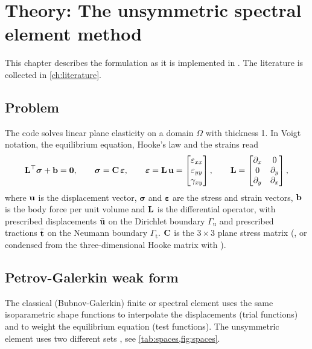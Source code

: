\chapter{Theory: The unsymmetric spectral element method}
\label{ch:theory}

This chapter describes the formulation as it is implemented in
. The literature is collected in \cref{ch:literature}.

\section{Problem}

The code solves linear plane elasticity on a domain $\Omega$ with thickness 1. In
Voigt notation, the equilibrium equation, Hooke's law and the strains read
\begin{equation}
  \mathbf{L}^{\top}\bm\sigma + \mathbf{b} = \mathbf{0},\qquad
  \bm\sigma = \mathbf{C}\,\bm\varepsilon,\qquad
  \bm\varepsilon = \mathbf{L}\,\mathbf{u} =
  \begin{bmatrix}\varepsilon_{xx}\\ \varepsilon_{yy}\\ \gamma_{xy}\end{bmatrix},
  \qquad
  \mathbf{L} = \begin{bmatrix}\partial_x & 0\\ 0 & \partial_y\\
                           \partial_y & \partial_x\end{bmatrix},
\end{equation}
where $\mathbf{u}$ is the displacement vector, $\bm\sigma$ and $\bm\varepsilon$ are
the stress and strain vectors, $\mathbf{b}$ is the body force per unit volume and
$\mathbf{L}$ is the differential operator, with prescribed displacements
$\bar{\mathbf{u}}$ on the Dirichlet boundary $\Gamma_\mathrm{u}$ and prescribed
tractions $\bar{\mathbf{t}}$ on the Neumann boundary $\Gamma_\mathrm{t}$. $\mathbf{C}$ is
the $3\times3$ plane stress matrix (, or condensed from the
three-dimensional Hooke matrix with ).

\section{Petrov-Galerkin weak form}

The classical (Bubnov-Galerkin) finite or spectral element uses the same
isoparametric shape functions to interpolate the displacements (trial
functions) and to weight the equilibrium equation (test functions). The
unsymmetric element uses two different sets \parencite{Rajendran2010technique},
see \cref{tab:spaces,fig:spaces}.

